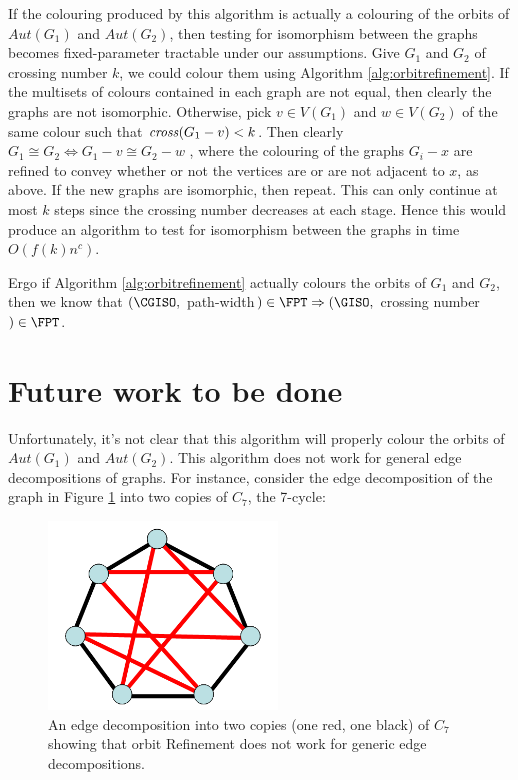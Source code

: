 \documentclass[11pt]{report}
\newcommand{\cross}{\mbox{\emph{cross}}}
\begin{document}
If the colouring produced by this algorithm is actually a colouring of the orbits of $Aut(G_1)$ and $Aut(G_2)$, then testing for isomorphism between the graphs becomes fixed-parameter tractable under our assumptions. Give $G_1$ and $G_2$ of crossing number $k$, we could colour them using Algorithm \ref{alg:orbitrefinement}. If the multisets of colours contained in each graph are not equal, then clearly the graphs are not isomorphic. Otherwise, pick $v\in V(G_1)$ and $w\in V(G_2)$ of the same colour such that $\cross(G_1-v)<k$. Then clearly $G_1 \cong G_2 \Leftrightarrow G_1-v \cong G_2-w$ , where the colouring of the graphs $G_i - x$ are refined to convey whether or not the vertices are or are not adjacent to $x$, as above.  If the new graphs are isomorphic, then repeat. This can only continue at most $k$ steps since the crossing number decreases at each stage. Hence this would produce an algorithm to test for isomorphism between the graphs in time $O(f(k)n^c)$. 


Ergo if Algorithm \ref{alg:orbitrefinement} actually colours the orbits of $G_1$ and $G_2$, then we know that $(\CGISO,$  path-width$)\in \FPT \Rightarrow (\GISO,$ crossing number$)\in \FPT$.




\section{Future work to be done}


Unfortunately, it's not clear that this algorithm will properly colour the orbits of $Aut(G_1)$ and $Aut(G_2)$. This algorithm does not work for general edge decompositions of graphs. For instance, consider the edge decomposition of the graph in Figure \ref{fig:edge_decomp_fails} into two copies of $C_7$, the 7-cycle:


\begin{figure}[h]
\begin{center}
\leavevmode
\includegraphics[height=50mm]{Crossing_Decomp_Alg_Fails_v0.png}
\end{center}
\caption{An edge decomposition into two copies (one red, one black) of $C_7$ showing that orbit Refinement does not work for generic edge decompositions.}
\label{fig:edge_decomp_fails}
\end{figure}
\end{document}

